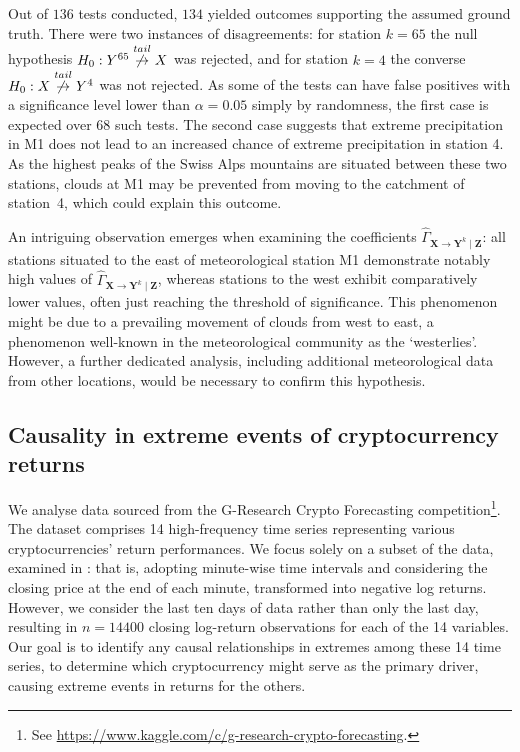 \documentclass[a4paper,11pt]{article}
\newcommand{\toverset}[2]{\overset{{\rm #1}}{#2}}
\begin{document}
Out of $136$ tests conducted, $134$ yielded outcomes supporting the assumed ground truth. There were two instances of disagreements: for station $k=65$ the null hypothesis $H_0: \textbf{Y}^{65}\toverset{tail}{\not\to}\textbf{X}$ was rejected, and for station $k=4$ the converse $H_0: \textbf{X}\toverset{tail}{\not \to}\textbf{Y}^{4}$ was not rejected. As some of the tests can have false positives with a significance level lower than $\alpha=0.05$ simply by randomness, the first case is expected over $68$ such tests. The second case suggests that extreme precipitation in M1 does not lead to an increased chance of extreme precipitation in station 4.  As the highest peaks of the Swiss Alps mountains are situated between these two stations, clouds at M1 may be prevented from moving to the catchment of station~4, which could explain this outcome. 
 
An intriguing observation emerges when examining the coefficients $\hat{\Gamma}_{\textbf{X}\to\textbf{Y}^k \mid \textbf{Z}}$: all stations situated to the east of meteorological station M1 demonstrate notably high values of $\hat{\Gamma}_{\textbf{X}\to\textbf{Y}^k \mid \textbf{Z}}$, whereas stations to the west exhibit comparatively lower values, often just reaching the threshold of significance. 
This phenomenon might be due to a prevailing movement of clouds from west to east, a phenomenon well-known in the meteorological community as the `westerlies'. 
However, a further dedicated analysis, including additional meteorological data from other locations, would be necessary to confirm this hypothesis.


\subsection{Causality in extreme events of cryptocurrency returns}
\label{section_crypto_application}
We analyse data sourced from the G-Research Crypto Forecasting competition\footnote{See \url{https://www.kaggle.com/c/g-research-crypto-forecasting}.}. 
The dataset comprises 14 high-frequency time series representing various cryptocurrencies' return performances. 
We focus solely on a subset of the data, examined in \cite{g-research-crypto-forecastingII}: that is, adopting minute-wise time intervals and considering the closing price at the end of each minute, transformed into negative log returns. 
However, we consider the last ten days of data rather than only the last day, resulting in $n=14400$ closing log-return observations for each of the 14 variables.
Our goal is to identify any causal relationships in extremes among these 14 time series, to determine which cryptocurrency might serve as the primary driver, causing extreme events in returns for the others.
\end{document}
